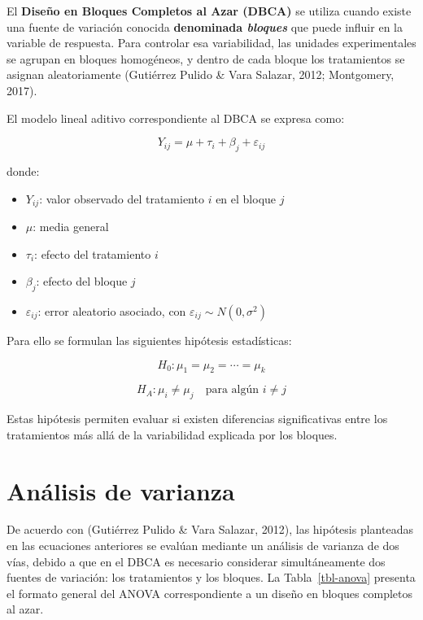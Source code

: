 \documentclass[
  spanish,
  letterpaper,
  DIV=11,
  numbers=noendperiod]{scrreprt}
\providecommand{\tightlist}{%
  \setlength{\itemsep}{0pt}\setlength{\parskip}{0pt}}
\begin{document}
El \textbf{Diseño en Bloques Completos al Azar (DBCA)} se utiliza cuando
existe una fuente de variación conocida \textbf{denominada
\emph{bloques}} que puede influir en la variable de respuesta. Para
controlar esa variabilidad, las unidades experimentales se agrupan en
bloques homogéneos, y dentro de cada bloque los tratamientos se asignan
aleatoriamente (Gutiérrez Pulido \& Vara Salazar, 2012; Montgomery,
2017).

El modelo lineal aditivo correspondiente al DBCA se expresa como:

\[
Y_{ij} = \mu + \tau_i + \beta_j + \varepsilon_{ij}
\]

donde:

\begin{itemize}
\tightlist
\item
  \(Y_{ij}\): valor observado del tratamiento \(i\) en el bloque \(j\)
\item
  \(\mu\): media general
\item
  \(\displaystyle \tau_i\): efecto del tratamiento \(i\)
\item
  \(\displaystyle \beta_j\): efecto del bloque \(j\)
\item
  \(\displaystyle \varepsilon_{ij}\): error aleatorio asociado, con
  \(\displaystyle \varepsilon_{ij} \sim N(0,\sigma^2)\)
\end{itemize}

Para ello se formulan las siguientes hipótesis estadísticas:

\[
H_0 : \mu_1 = \mu_2 = \cdots = \mu_k
\]

\[
H_A : \mu_i \ne \mu_j \quad \text{para algún } i \ne j
\]

Estas hipótesis permiten evaluar si existen diferencias significativas
entre los tratamientos más allá de la variabilidad explicada por los
bloques.

\section{Análisis de varianza}\label{anuxe1lisis-de-varianza}

De acuerdo con (Gutiérrez Pulido \& Vara Salazar, 2012), las hipótesis
planteadas en las ecuaciones anteriores se evalúan mediante un análisis
de varianza de dos vías, debido a que en el DBCA es necesario considerar
simultáneamente dos fuentes de variación: los tratamientos y los
bloques. La Tabla~\ref{tbl-anova} presenta el formato general del ANOVA
correspondiente a un diseño en bloques completos al azar.
\end{document}
